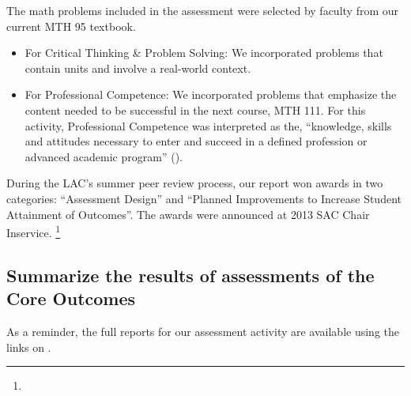 \begin{description}
The math problems included in the assessment were selected by faculty from our
current MTH 95 textbook.
\begin{itemize}
\item For Critical Thinking \& Problem Solving: We incorporated problems that contain units and involve a
  real-world context.
\item For Professional Competence:  We incorporated problems that emphasize the content needed to be
  successful in the next course, MTH 111.  For this activity, Professional
  Competence was interpreted as the, ``knowledge, skills and attitudes necessary
  to enter and succeed in a defined profession or advanced academic program''
  (\cite{coreoutcomes}).
\end{itemize}
During the LAC's summer peer review process, our report won awards in two
categories: ``Assessment Design'' and ``Planned Improvements to Increase Student
Attainment of Outcomes''.  The awards were announced at 2013 SAC Chair
Inservice. \footnote{\awardsurl}
\end{description}

\subsection{Summarize the results of assessments of the Core Outcomes}
As a reminder, the full reports for our assessment activity are available using
the links on .


